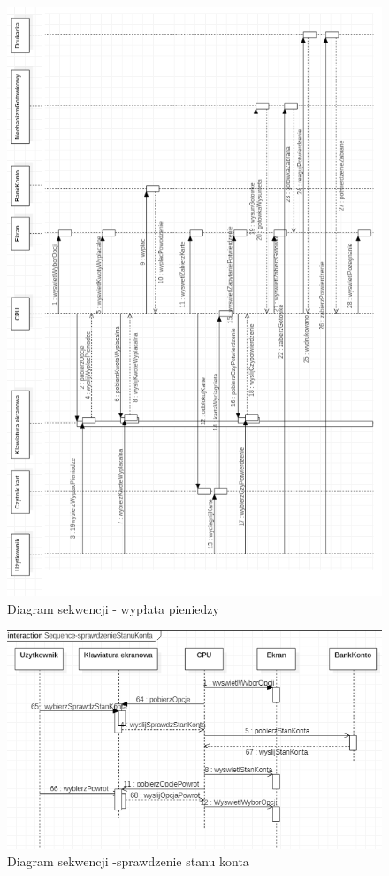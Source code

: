 \documentclass[a4paper, 11pt]{article}
\begin{document}
	\begin{figure}[H]%
			\includegraphics[scale=0.9]{sequence2.png}\caption{Diagram sekwencji - wypłata pieniedzy}
	\end{figure}
	
	\begin{figure}[H]%
			\includegraphics[scale=0.9]{sequence3.png}\caption{Diagram sekwencji -sprawdzenie stanu konta}
	\end{figure}
	
\end{document}
